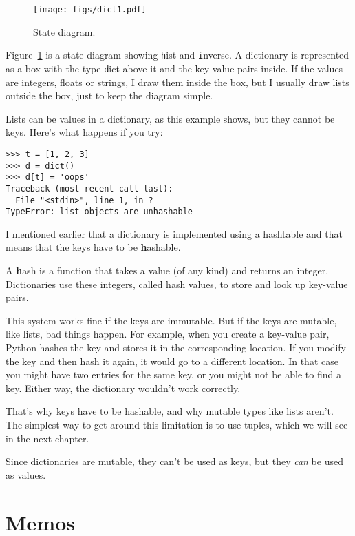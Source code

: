 \documentclass[
DIV=11,
fontsize=13,
twoside,
headinclude=false,
titlepage=firstiscover,
abstract=true,
headsepline=true,
footsepline=true,
chapterprefix=true, %
headings=big,
bibliography=totoc,%
captions=tableheading
]{scrbook}
\theoremstyle{definition}
\begin{document}
\begin{figure}
\centerline
{\texttt{[image: figs/dict1.pdf]}}
\caption{State diagram.}
\label{fig.dict1}
\end{figure}

Figure~\ref{fig.dict1} is a state diagram showing {\texttt hist} and {\texttt inverse}.
A dictionary is represented as a box with the type {\texttt dict} above it
and the key-value pairs inside.  If the values are integers, floats or
strings, I draw them inside the box, but I usually draw lists
outside the box, just to keep the diagram simple.

Lists can be values in a dictionary, as this example shows, but they
cannot be keys.  Here's what happens if you try:


\begin{lstlisting}
>>> t = [1, 2, 3]
>>> d = dict()
>>> d[t] = 'oops'
Traceback (most recent call last):
  File "<stdin>", line 1, in ?
TypeError: list objects are unhashable
\end{lstlisting}
%
I mentioned earlier that a dictionary is implemented using
a hashtable and that means that the keys have to be {\textbf hashable}.

A {\textbf hash} is a function that takes a value (of any kind)
and returns an integer.  Dictionaries use these integers,
called hash values, to store and look up key-value pairs.

This system works fine if the keys are immutable.  But if the
keys are mutable, like lists, bad things happen.  For example,
when you create a key-value pair, Python hashes the key and 
stores it in the corresponding location.  If you modify the
key and then hash it again, it would go to a different location.
In that case you might have two entries for the same key,
or you might not be able to find a key.  Either way, the
dictionary wouldn't work correctly.

That's why keys have to be hashable, and why mutable types like
lists aren't.  The simplest way to get around this limitation is to
use tuples, which we will see in the next chapter.

Since dictionaries are mutable, they can't be used as keys,
but they {\em can} be used as values.


\section{Memos}
\label{memoize}
\end{document}

